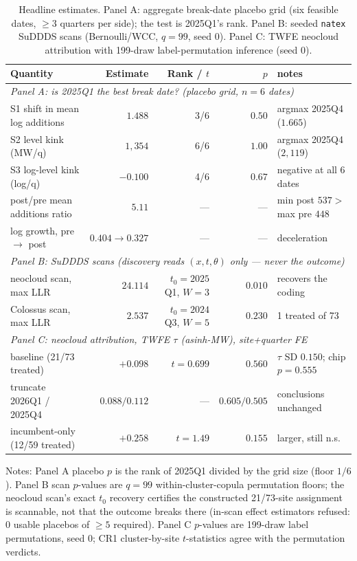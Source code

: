 \documentclass[11pt]{article}
\newcommand{\natex}{\texttt{natex}}
\begin{document}
\begin{table}[t]
\centering
\footnotesize
\setlength{\tabcolsep}{3pt}
\caption{Headline estimates. Panel A: aggregate break-date placebo grid (six
feasible dates, $\geq 3$ quarters per side); the test is 2025Q1's rank.
Panel B: seeded \natex{} SuDDDS scans (Bernoulli/WCC, $q=99$, seed 0).
Panel C: TWFE neocloud attribution with 199-draw label-permutation inference
(seed 0).}
\label{tab:main}
\begin{tabular}{lrrrl}
\toprule
Quantity & Estimate & Rank / $t$ & $p$ & notes \\
\midrule
\multicolumn{5}{l}{\emph{Panel A: is 2025Q1 the best break date? (placebo grid, $n=6$ dates)}}\\
S1 shift in mean log additions & $1.488$ & 3/6 & $0.50$ & argmax 2025Q4 ($1.665$) \\
S2 level kink (MW/q)           & $1{,}354$ & 6/6 & $1.00$ & argmax 2025Q4 ($2{,}119$) \\
S3 log-level kink (log/q)      & $-0.100$ & 4/6 & $0.67$ & negative at all 6 dates \\
post/pre mean additions ratio  & $5.11$ & --- & --- & min post $537 >$ max pre $448$ \\
log growth, pre $\to$ post     & $0.404 \to 0.327$ & --- & --- & deceleration \\
\midrule
\multicolumn{5}{l}{\emph{Panel B: SuDDDS scans (discovery reads $(x,t,\theta)$ only --- never the outcome)}}\\
neocloud scan, max LLR    & $24.114$ & $t_0=2025$Q1, $W=3$ & $0.010$ & recovers the coding \\
Colossus scan, max LLR    & $2.537$  & $t_0=2024$Q3, $W=5$ & $0.230$ & 1 treated of 73 \\
\midrule
\multicolumn{5}{l}{\emph{Panel C: neocloud attribution, TWFE $\tau$ (asinh-MW), site+quarter FE}}\\
baseline (21/73 treated)  & $+0.098$ & $t=0.699$ & $0.560$ & $\tau$ SD $0.150$; chip $p=0.555$ \\
truncate 2026Q1 / 2025Q4  & $0.088/0.112$ & --- & $0.605/0.505$ & conclusions unchanged \\
incumbent-only (12/59 treated) & $+0.258$ & $t=1.49$ & $0.155$ & larger, still n.s. \\
\bottomrule
\end{tabular}

\medskip
\parbox{0.92\textwidth}{\footnotesize Notes: Panel A placebo $p$ is the rank
of 2025Q1 divided by the grid size (floor $1/6$). Panel B scan $p$-values are
$q=99$ within-cluster-copula permutation floors; the neocloud scan's exact
$t_0$ recovery certifies the constructed 21/73-site assignment is scannable,
not that the outcome breaks there (in-scan effect estimators refused: 0
usable placebos of $\geq 5$ required). Panel C $p$-values are 199-draw label
permutations, seed 0; CR1 cluster-by-site $t$-statistics agree with the
permutation verdicts.}
\end{table}
\end{document}
